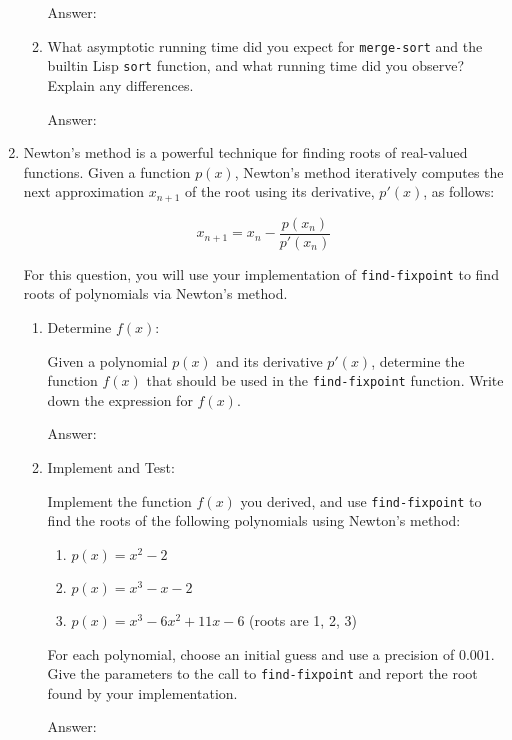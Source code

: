 \documentclass[12pt,letterpaper]{ntdhw}
\begin{document}
\begin{enumerate}
\begin{enumerate}
    \begin{emph}
      Answer: %
    \end{emph}

  \item What asymptotic running time did you expect for
    \texttt{merge-sort} and the builtin Lisp \texttt{sort} function, and
    what running time did you observe?  Explain any differences.

    \begin{emph}
      Answer: %
    \end{emph}

    \end{enumerate}

  \item Newton's method is a powerful technique for finding roots of real-valued functions. Given a function \( p(x) \), Newton's method iteratively computes the next approximation \( x_{n+1} \) of the root using its derivative, \( p'(x) \), as follows:

    \[
    x_{n+1} = x_n - \frac{p(x_n)}{p'(x_n)}
    \]

    For this question, you will use your implementation of {\tt find-fixpoint} to find roots of polynomials via Newton's method.
  \begin{enumerate}
    \item Determine \( f(x) \):

    Given a polynomial \( p(x) \) and its derivative \( p'(x) \), determine the function \( f(x) \) that should be used in the {\tt find-fixpoint} function. Write down the expression for \( f(x) \).

    \begin{emph}
      Answer: %
    \end{emph}

    \item Implement and Test:

    Implement the function \( f(x) \) you derived, and use {\tt find-fixpoint} to find the roots of the following polynomials using Newton's method:
    \begin{enumerate}
      \item \( p(x) = x^2 - 2 \)
      \item \( p(x) = x^3 - x - 2 \)
      \item \( p(x) = x^3 - 6x^2 + 11x - 6 \) (roots are 1, 2, 3)
    \end{enumerate}

    For each polynomial, choose an initial guess and use a precision of \( 0.001 \). Give the parameters to the call to {\tt find-fixpoint} and report the root found by your implementation.

    \begin{emph}
      Answer: %
    \end{emph}

  \end{enumerate}

\end{enumerate}
\end{document}
